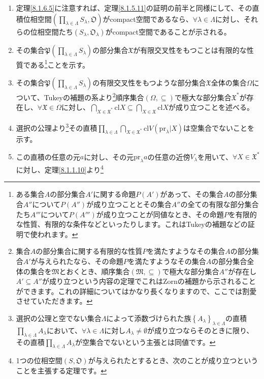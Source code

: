 \documentclass[dvipdfmx]{jsarticle}
\begin{document}
\begin{enumerate}
\item
  定理\ref{8.1.6.5}に注意すれば、定理\ref{8.1.5.11}の証明の前半と同様にして、その直積位相空間$\left( \prod_{\lambda \in \varLambda} S_{\lambda},\mathfrak{O} \right)$がcompact空間であるなら、$\forall\lambda \in \varLambda$に対し、それらの位相空間たち$\left( S_{\lambda},\mathfrak{O}_{\lambda} \right)$がcompact空間であることが示される。
\item
  その集合$\mathfrak{P}\left( \prod_{\lambda \in \varLambda} S_{\lambda} \right)$の部分集合$\mathfrak{X}$が有限交叉性をもつことは有限的な性質である\footnote{ある集合$A$の部分集合$A'$に関する命題$P\left( A' \right)$があって、その集合$A$の部分集合$A''$について$P\left( A'' \right)$が成り立つこととその集合$A''$の全ての有限な部分集合たち$A'''$について$P\left( A''' \right)$が成り立つことが同値なとき、その命題$P$を有限的な性質、有限的な条件などといったりします。これはTukeyの補題などの証明で使われます。}ことを示す。
\item
  その集合$\mathfrak{P}\left( \prod_{\lambda \in \varLambda} S_{\lambda} \right)$の有限交叉性をもつような部分集合$\mathfrak{X}$全体の集合$\varOmega$について、Tukeyの補題の系より\footnote{集合$A$の部分集合に関する有限的な性質$P$を満たすようなその集合$A$の部分集合$A'$が与えられたなら、その命題$P$を満たすようなその集合$A$の部分集合全体の集合を$\mathfrak{M}$とおくとき、順序集合$\mathfrak{(M, \subseteq )}$で極大な部分集合$A''$が存在し$A' \subseteq A''$が成り立つという内容の定理でこれはZornの補題から示されることができます。これの詳細についてはかなり長くなりますので、ここでは割愛させていただきます。}順序集合$(\varOmega, \subseteq )$で極大な部分集合$\mathfrak{X}^{*}$が存在し、$\mathfrak{\forall X \in}\varOmega$に対し、$\bigcap_{X \in \mathfrak{X}^{*}} {{\mathrm{cl}}X} \subseteq \bigcap_{X \in \mathfrak{X}} {{\mathrm{cl}}X}$が成り立つことを述べる。
\item
  選択の公理より\footnote{選択の公理と空でない集合$\varLambda$によって添数づけられた族$\left\{ A_{\lambda} \right\}_{\lambda \in \varLambda}$の直積$\prod_{\lambda \in \varLambda} A_{\lambda}$において、$\forall\lambda \in \varLambda に対しA_{\lambda} \neq \emptyset$が成り立つならそのときに限り、その直積$\prod_{\lambda \in \varLambda} A_{\lambda}$が空集合でないという主張とは同値です。}その直積$\prod_{\lambda \in \varLambda} {\bigcap_{X \in \mathfrak{X}^{*}} {{\mathrm{cl}}{V\left( {\mathrm{pr}}_{\lambda}|X \right)}}}$は空集合でないことを示す。
\item
  この直積の任意の元$a$に対し、その元${\mathrm{pr}}_{\lambda}a$の任意の近傍$V_{\lambda}$を用いて、$\forall X \in \mathfrak{X}^{*}$に対し、定理\ref{8.1.1.10}より\footnote{1つの位相空間$\left( S,\mathfrak{O} \right)$が与えられたとするとき、次のことが成り立つということを主張する定理です。
}
\end{enumerate}
\end{document}
